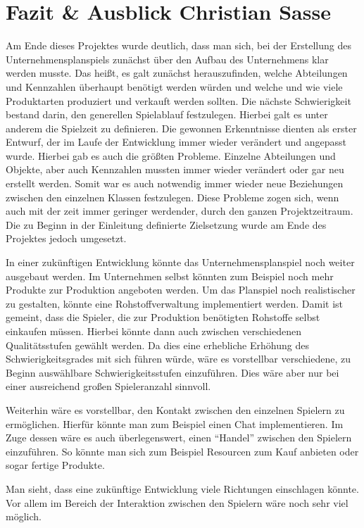 \chapter{Fazit \& Ausblick  \textnormal{\textsf{\small{Christian Sasse}}}}

Am Ende dieses Projektes wurde deutlich, dass man sich, bei der Erstellung des Unternehmensplanspiels zunächst über den Aufbau des Unternehmens klar werden musste. Das heißt, es galt zunächst herauszufinden, welche Abteilungen und Kennzahlen überhaupt benötigt werden würden und welche und wie viele Produktarten produziert und verkauft werden sollten.
Die nächste Schwierigkeit bestand darin, den generellen Spielablauf festzulegen. Hierbei galt es unter anderem die Spielzeit zu definieren.
Die gewonnen Erkenntnisse dienten als erster Entwurf, der im Laufe der Entwicklung immer wieder verändert und angepasst wurde. Hierbei gab es auch die größten Probleme. Einzelne Abteilungen und Objekte, aber auch Kennzahlen mussten immer wieder verändert oder gar neu erstellt werden. Somit war es auch notwendig immer wieder neue Beziehungen zwischen den einzelnen Klassen festzulegen. Diese Probleme zogen sich, wenn auch mit der zeit immer geringer werdender, durch den ganzen Projektzeitraum. Die zu Beginn in der Einleitung definierte Zielsetzung wurde am Ende des Projektes jedoch umgesetzt.

In einer zukünftigen Entwicklung könnte das Unternehmensplanspiel noch weiter ausgebaut werden. Im Unternehmen selbst könnten zum Beispiel noch mehr Produkte zur Produktion angeboten werden.
Um das Planspiel noch realistischer zu gestalten, könnte eine Rohstoffverwaltung implementiert werden. Damit ist gemeint, dass die Spieler, die zur Produktion benötigten Rohstoffe selbst einkaufen müssen. Hierbei könnte dann auch zwischen verschiedenen Qualitätsstufen gewählt werden. Da dies eine erhebliche Erhöhung des Schwierigkeitsgrades mit sich führen würde, wäre es vorstellbar verschiedene, zu Beginn auswählbare Schwierigkeitsstufen einzuführen. Dies wäre aber nur bei einer ausreichend großen Spieleranzahl sinnvoll.

Weiterhin wäre es vorstellbar, den Kontakt zwischen den einzelnen Spielern zu ermöglichen. Hierfür könnte man zum Beispiel einen Chat implementieren. Im Zuge dessen wäre es auch überlegenswert, einen \enquote{Handel} zwischen den Spielern einzuführen. So könnte man sich zum Beispiel Resourcen zum Kauf anbieten oder sogar fertige Produkte.

Man sieht, dass eine zukünftige Entwicklung viele Richtungen einschlagen könnte. Vor allem im Bereich der Interaktion zwischen den Spielern wäre noch sehr viel möglich.

